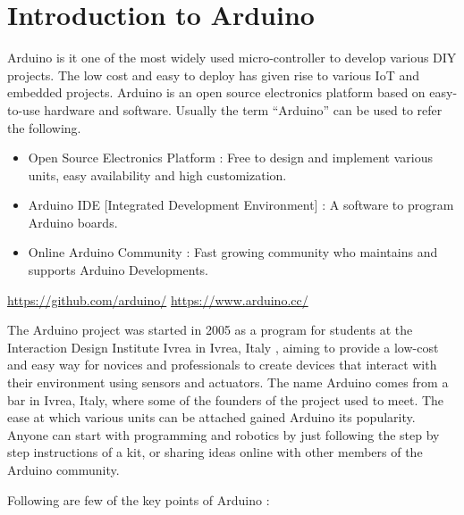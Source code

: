 \chapter{Introduction to Arduino}
\label{ch:arduino-uno}
\par Arduino is it one of the most widely used micro-controller to develop various DIY projects. The low cost and easy to deploy has given rise to various \ac{IoT} and embedded projects. Arduino is an open source electronics platform based on easy-to-use hardware and software. Usually the term “Arduino” can be used to refer the following.

\begin{itemize}
    \item Open Source Electronics Platform : Free to design and implement various units, easy availability and high customization. 
    \item Arduino IDE [Integrated Development Environment] : A software to program Arduino boards.
    \item Online Arduino Community : Fast growing community who maintains and supports Arduino Developments.
\end{itemize}

\url{https://github.com/arduino/} \hspace{0.5cm} \url{https://www.arduino.cc/}

\par The Arduino project was started in 2005 as a program for students at the Interaction Design Institute Ivrea in Ivrea, Italy , aiming to provide a low-cost and easy way for novices and professionals to create devices that interact with their environment using sensors and actuators. The name Arduino comes from a bar in Ivrea, Italy, where some of the founders of the project used to meet. The ease at which various units can be attached gained Arduino its popularity. Anyone can start with programming and robotics by just following the step by step instructions of a kit, or sharing ideas online with other members of the Arduino community.

\par Following are few of the key points of Arduino :

